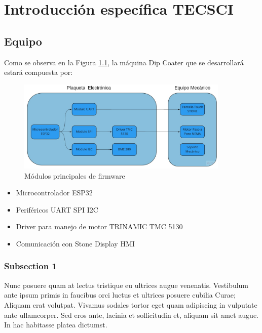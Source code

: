 
\chapter{Introducción específica TECSCI} %

\label{Chapter7} %


\section{Equipo}

Como se observa en la Figura \ref{fig:equipo}, la máquina Dip Coater que se desarrollará estará compuesta por:

\begin{figure}[htpb]
\centering 
\includegraphics[width=0.9\textwidth]{./Figures/equipo.png}
\caption{Módulos principales de firmware}
\label{fig:equipo}
\end{figure}
\vspace{25px}


\begin{itemize}
\item Microcontrolador ESP32 
\item Periféricos UART SPI I2C 
\item Driver para manejo de motor TRINAMIC  TMC 5130
\item Comunicación con Stone Display HMI 
\end{itemize}


\subsection{Subsection 1}

Nunc posuere quam at lectus tristique eu ultrices augue venenatis. Vestibulum ante ipsum primis in faucibus orci luctus et ultrices posuere cubilia Curae; Aliquam erat volutpat. Vivamus sodales tortor eget quam adipiscing in vulputate ante ullamcorper. Sed eros ante, lacinia et sollicitudin et, aliquam sit amet augue. In hac habitasse platea dictumst.

